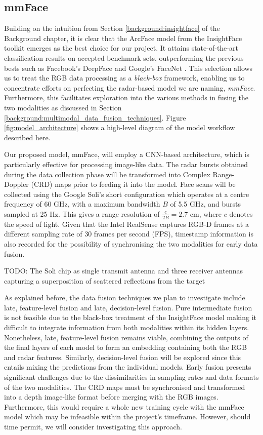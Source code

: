 \documentclass{mpaper}
\begin{document}
\subsection{mmFace}
Building on the intuition from Section \ref{background:insightface} of the Background chapter, it is clear that the ArcFace model from the InsightFace toolkit emerges as the best choice for our project. It attains state-of-the-art classification results on accepted benchmark sets, outperforming the previous bests such as Facebook's DeepFace \cite{taigman2014deepface} and Google's FaceNet \cite{schroff2015facenet}. This selection allows us to treat the RGB data processing as a \textit{black-box} framework, enabling us to concentrate efforts on perfecting the radar-based model we are naming, \textit{mmFace}. Furthermore, this facilitates exploration into the various methods in fusing the two modalities as discussed in Section \ref{background:multimodal_data_fusion_techniques}. Figure \ref{fig:model_architecture} shows a high-level diagram of the model workflow described here. 

Our proposed model, mmFace, will employ a CNN-based architecture, which is particularly effective for processing image-like data. The radar bursts obtained during the data collection phase will be transformed into Complex Range-Doppler (CRD) maps \cite{lien2016soli,hayashi2021radarnet} prior to feeding it into the model. Face scans will be collected using the Google Soli's short configuration which operates at a centre frequency of 60 GHz, with a maximum bandwidth $B$ of 5.5 GHz, and bursts sampled at 25 Hz. This gives a range resolution of $\frac{c}{2B} = 2.7$ cm, where $c$ denotes the speed of light. Given that the Intel RealSense captures RGB-D frames at a different sampling rate of 30 frames per second (FPS), timestamp information is also recorded for the possibility of synchronising the two modalities for early data fusion.

TODO:
The Soli chip as single transmit antenna and three receiver antennas capturing a superposition of scattered reflections from the target

As explained before, the data fusion techniques we plan to investigate include late, feature-level fusion and late, decision-level fusion. Pure intermediate fusion is not feasible due to the black-box treatment of the InsightFace model making it difficult to integrate information from both modalities within its hidden layers. Nonetheless, late, feature-level fusion remains viable, combining the outputs of the final layers of each model to form an embedding containing both the RGB and radar features. Similarly, decision-level fusion will be explored since this entails mixing the predictions from the individual models. Early fusion presents significant challenges due to the dissimilarities in sampling rates and data formats of the two modalities. The CRD maps must be synchronised and transformed into a depth image-like format before merging with the RGB images. Furthermore, this would require a whole new training cycle with the mmFace model which may be infeasible within the project's timeframe. However, should time permit, we will consider investigating this approach.
\end{document}
